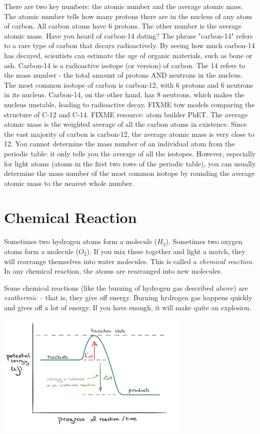 There are two key numbers: the atomic number and the average atomic mass. The 
atomic number tells how many protons there are in the nucleus of any atom of 
carbon. All carbon atoms have 6 protons. The other number is the average atomic 
mass. Have you heard of carbon-14 dating? The phrase "carbon-14" refers to a rare 
type of carbon that decays radioactively. By seeing how much carbon-14 has 
decayed, scientists can estimate the age of organic materials, such as bone or 
ash. Carbon-14 is a radioactive isotope (or version) of carbon. The 14 refers to 
the mass number - the total amount of protons AND neutrons in the nucleus. The 
most common isotope of carbon is carbon-12, with 6 protons and 6 neutrons in its 
nucleus. Carbon-14, on the other hand, has 8 neutrons, which makes the nucleus 
unstable, leading to radioactive decay. FIXME tow models comparing the structure 
of  C-12 and C-14. FIXME resource: atom builder PhET. The average atomic mass is 
the weighted average of all the carbon atoms in existence. Since the vast 
majority of carbon is carbon-12, the average atomic mass is very close to 12. You 
cannot determine the mass number of an individual atom from the periodic table: 
it only tells you the average of all the isotopes. However, especially for light 
atoms (atoms in the first two rows of the periodic table), you can usually 
determine the mass number of the most common isotope by rounding the average 
atomic mass to the nearest whole number. 

\section{Chemical Reaction}

Sometimes two hydrogen atoms form a molecule ($H_2$). Sometimes two
oxygen atoms form a molecule ($O_2$). If you mix these
together and light a match, they will rearrange themselves into water
molecules. This is called a \textit{chemical reaction}.  In any
chemical reaction, the atoms are rearranged into new molecules.

Some chemical reactions (like the burning of hydrogen gas described
above) are \textit{exothermic} -- that is, they give off energy.
Burning hydrogen gas happens quickly and gives off a lot of energy. If
you have enough, it will make quite an explosion.

\includegraphics[width=0.7\textwidth]{KA_Exo.png}

